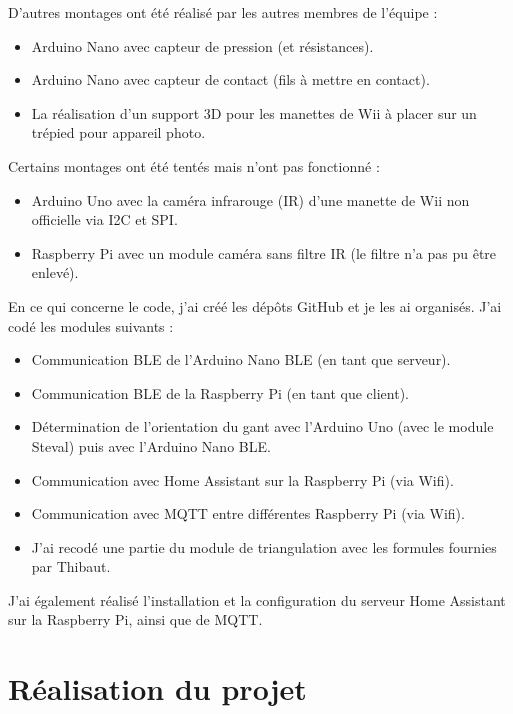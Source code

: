 \documentclass{article}
\begin{document}
            D'autres montages ont été réalisé par les autres membres de l'équipe :
            \begin{itemize}
                \item Arduino Nano avec capteur de pression (et résistances).
                \item Arduino Nano avec capteur de contact (fils à mettre en contact).
                \item La réalisation d'un support 3D pour les manettes de Wii à placer sur un trépied pour appareil photo.
            \end{itemize}

            Certains montages ont été tentés mais n'ont pas fonctionné :
            \begin{itemize}
                \item Arduino Uno avec la caméra infrarouge (IR) d'une manette de Wii non officielle via I2C et SPI.
                \item Raspberry Pi avec un module caméra sans filtre IR (le filtre n'a pas pu être enlevé).
            \end{itemize}

            En ce qui concerne le code, j'ai créé les dépôts GitHub et je les ai organisés. J'ai codé les modules suivants :
            \begin{itemize}
                \item Communication BLE de l'Arduino Nano BLE (en tant que serveur).
                \item Communication BLE de la Raspberry Pi (en tant que client).
                \item Détermination de l'orientation du gant avec l'Arduino Uno (avec le module Steval) puis avec l'Arduino Nano BLE.
                \item Communication avec Home Assistant sur la Raspberry Pi (via Wifi).
                \item Communication avec MQTT entre différentes Raspberry Pi (via Wifi).
                \item J'ai recodé une partie du module de triangulation avec les formules fournies par Thibaut.
            \end{itemize}

            J'ai également réalisé l'installation et la configuration du serveur Home Assistant sur la Raspberry Pi, ainsi 
            que de MQTT.

    \section{Réalisation du projet}
\end{document}
